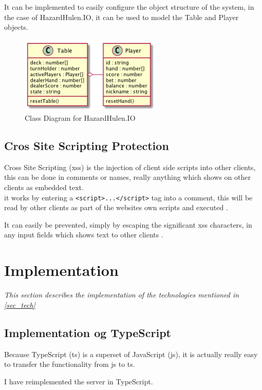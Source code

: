 \documentclass[a4paper]{article}
\begin{document}
It can be implemented to easily configure the object structure of the system, in the case of HazardHulen.IO, it can be used to model the Table and Player objects.

\begin{figure}[hbt]
  \centering
  \includegraphics[width=0.6\textwidth]{../UpdatedClassDiag}
  \caption{Class Diagram for HazardHulen.IO}
  \label{img_class_diag}
\end{figure}

\subsection{Cros Site Scripting Protection}
Cross Site Scripting (xss) is the injection of client side scripts into other clients, this can be done in comments or names, really anything which shows on other clients as embedded text.\\
it works by entering a \texttt{<script>...</script>} tag into a comment, this will be read by other clients as part of the websites own scripts and executed \cite{xss}.

It can easily be prevented, simply by escaping the significant xss characters, in any input fields which shows text to other clients \cite{xss-prep}.




\section{Implementation}
\label{sec_imp}
\textit{This section describes the implementation of the technologies mentioned in \autoref{sec_tech}}
\subsection{Implementation og TypeScript}
Because TypeScript (ts) is a superset of JavaScript (js), it is actually really easy to transfer the functionality from js to ts.

I have reimplemented the server in TypeScript.
\end{document}
